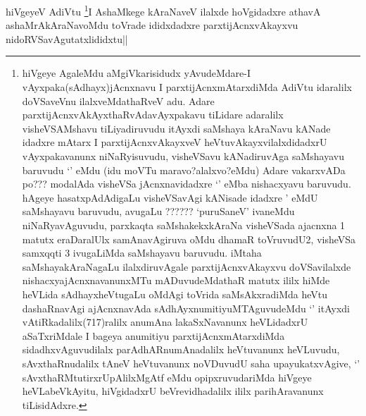\begin{artha}
hiVgeyeV AdiVtu \footnote{hiVgeye AgaleMdu aMgiVkarisidudx yAvudeMdare-I vAyxpaka(sAdhayx)jAcnxnavu I parxtijAcnxmAtarxdiMda AdiVtu idaralilx doVSaveVnu ilalxveMdathaRveV adu. Adare parxtijAcnxvAkAyxthaRvAdavAyxpakavu tiLidare adaralilx visheVSAMshavu tiLiyadiruvudu itAyxdi saMshaya kAraNavu kANade idadxre mAtarx I parxtijAcnxvAkayxveV heVtuvAkayxvilalxdidadxrU vAyxpakavanunx niNaRyisuvudu, visheVSavu kANadiruvAga saMshayavu baruvudu `\stext' eMdu (idu moVTu maravo?alalxvo?eMdu) Adare vakarxvADa po??? modalAda visheVSa jAcnxnavidadxre `\stext' eMba nishacxyavu baruvudu. hAgeye hasatxpAdAdigaLu visheVSavAgi kANisade idadxre \stext' eMdU saMshayavu baruvudu, avugaLu ?????? `puruSaneV' ivaneMdu niNaRyavAguvudu, parxkaqta saMshakekxkAraNa visheVSada ajacnxna 1 matutx eraDaralUlx samAnavAgiruva oMdu dhamaR toVruvudU2, visheVSa samxqqti 3 ivugaLiMda saMshayavu baruvudu. iMtaha saMshayakAraNagaLu ilalxdiruvAgale parxtijAcnxvAkayxvu doVSavilalxde nishacxyajAcnxnavanunxMTu mADuvudeMdathaR matutx ililx hiMde heVLida sAdhayxheVtugaLu oMdAgi toVrida saMsAkxradiMda heVtu dashaRnavAgi ajAcnxnavAda sAdhAyxnumitiyuMTAguvudeMdu `\stext' itAyxdi vAtiRkadalilx(717)ralilx anumAna lakaSxNavanunx heVLidadxrU aSaTxriMdale I bageya anumitiyu parxtijAcnxmAtarxdiMda sidadhxvAguvudilalx parAdhARnumAnadalilx heVtuvanunx heVLuvudu, sAvxthaRnudalilx tAneV heVtuvanunx noVDuvudU saha upayukatxvAgive, `\stext' sAvxthaRMtutirxrUpAlilxMgAtf \stext eMdu opipxruvudariMda hiVgeye heVLabeVkAyitu, hiVgidadxrU beVrevidhadalilx ililx parihAravanunx tiLisidAdxre.}I AshaMkege kAraNaveV ilalxde hoVgidadxre athavA ashaMrAkAraNavoMdu toVrade ididxdadxre parxtijAcnxvAkayxvu nidoRVSavAgutatxlididxtu||
\end{artha}
